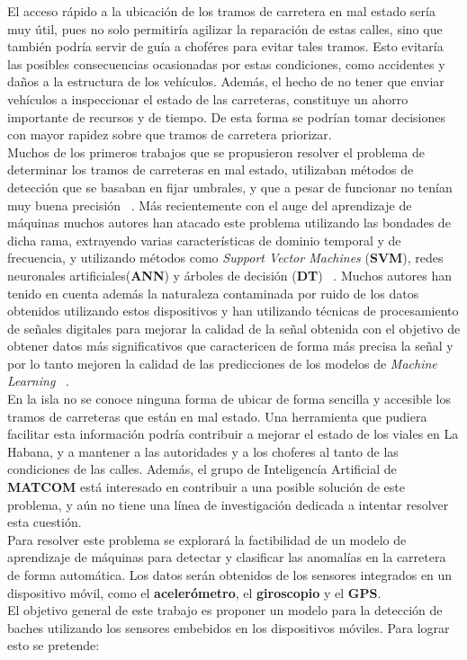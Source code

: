 \indent El acceso rápido a la ubicación de los tramos de carretera en mal estado sería muy útil, pues no solo permitiría agilizar la
reparación de estas calles, sino que también podría servir de guía a choféres para evitar tales tramos. Esto evitaría las posibles
consecuencias ocasionadas por estas condiciones, como accidentes y daños a la estructura de los vehículos. Además, el hecho de no tener que
enviar vehículos a inspeccionar el estado de las carreteras, constituye un ahorro importante de recursos y de tiempo. De esta forma se podrían
tomar decisiones con mayor rapidez sobre que tramos de carretera priorizar.\\
\indent Muchos de los primeros trabajos que se propusieron resolver el problema de determinar los tramos de carreteras en mal estado, utilizaban
métodos de detección que se basaban en fijar umbrales, y que a pesar de funcionar no tenían muy buena precisión ~. Más recientemente con el auge del aprendizaje de máquinas muchos autores han atacado este problema utilizando
las bondades de dicha rama, extrayendo varias características de dominio temporal y de frecuencia, y utilizando métodos como \emph{Support Vector
Machines} (\textbf{SVM}), redes neuronales artificiales(\textbf{ANN}) y árboles de decisión (\textbf{DT}) ~. Muchos autores han tenido en cuenta además la naturaleza contaminada por ruido de
los datos obtenidos utilizando estos dispositivos y han utilizando técnicas de procesamiento de señales digitales para mejorar la calidad de la señal
obtenida con el objetivo de obtener datos más significativos que caractericen de forma más precisa la señal y por lo tanto mejoren la calidad de las
predicciones de los modelos de \emph{Machine Learning} ~.\\
\indent En la isla no se conoce ninguna forma de ubicar de forma sencilla y accesible los tramos de carreteras que están en mal estado. Una herramienta
que pudiera facilitar esta información podría contribuir a mejorar el estado de los viales en La Habana, y a mantener a las autoridades y a los choferes
al tanto de las condiciones de las calles. Además, el grupo de Inteligencía Artificial de \textbf{MATCOM} está interesado en contribuir a una posible
solución de este problema, y aún no tiene una línea de investigación dedicada a intentar resolver esta cuestión.\\
\indent Para resolver este problema se explorará la factibilidad de un modelo de aprendizaje de máquinas para detectar y clasificar las anomalías en la
carretera de forma automática. Los datos serán obtenidos de los sensores integrados en un dispositivo móvil, como el \textbf{acelerómetro},
el \textbf{giroscopio} y el \textbf{GPS}.\\
\indent El objetivo general de este trabajo es proponer un modelo para la detección de baches utilizando los sensores embebidos en los
dispositivos móviles. Para lograr esto se pretende:

